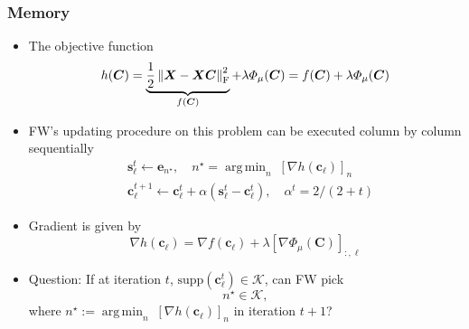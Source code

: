 \documentclass[10pt,xcolor={usenames,dvipsnames,table}]{beamer}
\newcommand{\norm}[1]{\left\lVert#1\right\rVert}
\DeclareMathOperator*{\argmin}{arg\,min}
\begin{document}
\begin{frame}
\frametitle{Memory}    
\begin{itemize}
    \item The objective function 
        \[
        h(\bm{C}) = \underbrace{\dfrac{1}{2} \norm{\bm{X} - \bm{X}\bm{C}}_{\rm F}^2}_{f(\bm{C})} + \lambda \varPhi_{\mu}(\bm{C}) = f(\bm{C}) + \lambda \varPhi_{\mu}(\bm{C})
    \]
    \item FW's updating procedure on this problem can be executed column by column sequentially
    \begin{align*}
    &\bm{s}_\ell^{t} \leftarrow \bm{e}_{n^{\star}}, \quad n^{\star} = \argmin_{n} \; [\nabla h(\bm{c}_\ell)]_n  \\
    &\bm{c}_\ell^{t+1} \leftarrow \bm{c}_\ell^{t} + \alpha (\bm{s}_{\ell}^{t}-\bm{c}_{\ell}^{t}), \quad \alpha^{t} = 2/(2+t)
    \end{align*} 
    \item Gradient is given by
\[ 
    \nabla h(\bm{c}_\ell) = \nabla f(\bm{c}_\ell) + \lambda [\nabla \varPhi_{\mu}(\bm{C})]_{:, \ell} 
\] 
\item Question: If at iteration $t$,  $\text{supp}(\bm{c}_\ell^{t}) \in \mathcal{K}$, can FW pick 
    \[ n^{\star} \in \mathcal{K}, \] where
    $n^{\star} := \argmin_{n}\;[\nabla h(\bm{c}_\ell)]_n$ in iteration $t+1$?
\end{itemize}



\end{frame}
\end{document}
